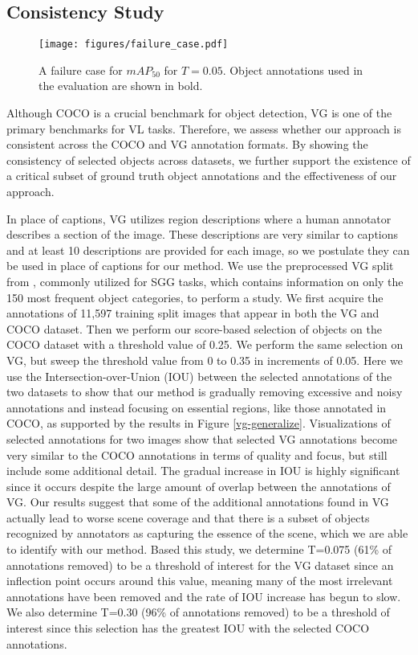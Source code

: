 \documentclass[10pt,twocolumn,letterpaper]{article}
\begin{document}
\subsection{Consistency Study}
\begin{figure}[t!]
\centering
\def\svgwidth{\columnwidth}
\texttt{[image: figures/failure\_case.pdf]}
\caption{A failure case for $mAP_{50}$ for $T\!\!=\!\!0.05$. Object annotations used in the evaluation are shown in bold.}
\label{failure}
\end{figure}
Although COCO is a crucial benchmark for object detection, VG is one of the primary benchmarks for VL tasks. Therefore, we assess whether our approach is consistent across the COCO and VG annotation formats. By showing the consistency of selected objects across datasets, we further support the existence of a critical subset of ground truth object annotations and the effectiveness of our approach.
\par
In place of captions, VG utilizes region descriptions where a human annotator describes a section of the image. These descriptions are very similar to captions and at least 10 descriptions are provided for each image, so we postulate they can be used in place of captions for our method. We use the preprocessed VG split from \cite{sgbase2017}, commonly utilized for SGG tasks, which contains information on only the 150 most frequent object categories, to perform a study. We first acquire the annotations of 11,597 training split images that appear in both the VG and COCO dataset. Then we perform our score-based selection of objects on the COCO dataset with a threshold value of 0.25. We perform the same selection on VG, but sweep the threshold value from 0 to 0.35 in increments of 0.05. Here we use the Intersection-over-Union (IOU) between the selected annotations of the two datasets to show that our method is gradually removing excessive and noisy annotations and instead focusing on essential regions, like those annotated in COCO, as supported by the results in Figure \ref{vg-generalize}. Visualizations of selected annotations for two images show that selected VG annotations become very similar to the COCO annotations in terms of quality and focus, but still include some additional detail. The gradual increase in IOU is highly significant since it occurs despite the large amount of overlap between the annotations of VG. Our results suggest that some of the additional annotations found in VG actually lead to worse scene coverage and that there is a subset of objects recognized by annotators as capturing the essence of the scene, which we are able to identify with our method. Based this study, we determine T=0.075 (61\% of annotations removed) to be a threshold of interest for the VG dataset since an inflection point occurs around this value, meaning many of the most irrelevant annotations have been removed and the rate of IOU increase has begun to slow. We also determine T=0.30 (96\% of annotations removed) to be a threshold of interest since this selection has the greatest IOU with the selected COCO annotations.
\end{document}
